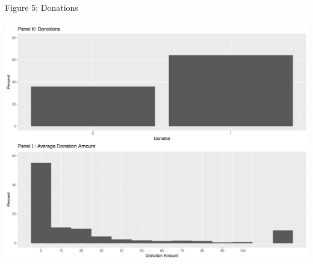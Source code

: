 \documentclass[12pt]{article}
\begin{document}
{\noindent Figure 5: Donations\\ \\
\includegraphics[scale=0.4]{Figure4.pdf}\\ \\



}
\end{document}
